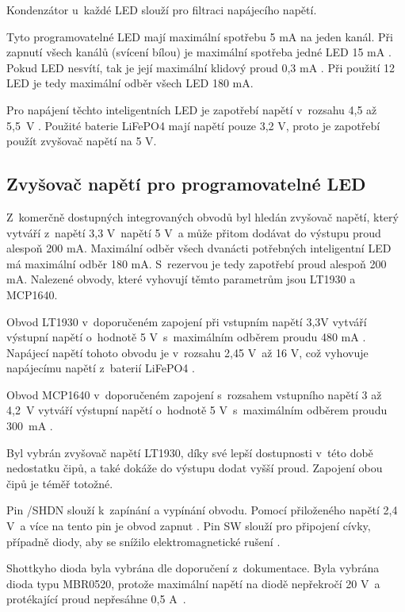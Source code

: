 Kondenzátor u~každé LED slouží pro filtraci napájecího napětí. 

Tyto programovatelné LED mají maximální spotřebu 5 mA na jeden kanál. Při zapnutí všech kanálů (svícení bílou) je maximální
spotřeba jedné LED 15 mA \cite{WS2812C_dtsh}. Pokud LED nesvítí, tak je její maximální klidový proud 0,3 mA \cite{WS2812C_dtsh}.
Při použití 12 LED je tedy maximální odběr všech LED 180 mA.

Pro napájení těchto inteligentních LED je zapotřebí napětí v~rozsahu 4,5 až 5,5~V \cite{WS2812C_dtsh}. 
Použité baterie LiFePO4 mají napětí pouze 3,2 V, proto je zapotřebí použít zvyšovač napětí na 5 V. 

\subsection{Zvyšovač napětí pro programovatelné LED}
Z~komerčně dostupných integrovaných obvodů byl hledán zvyšovač napětí, který vytváří z~napětí 3,3 V~napětí 5 V~a může přitom dodávat do výstupu proud alespoň 200 mA. 
Maximální odběr všech dvanácti potřebných inteligentní LED má maximální odběr 180 mA. S~rezervou je tedy zapotřebí proud alespoň 200 mA. Nalezené obvody, které vyhovují 
těmto parametrům jsou LT1930 a MCP1640. 

Obvod LT1930 v~doporučeném zapojení při vstupním napětí 3,3V vytváří výstupní napětí o~hodnotě 5 V~s~maximálním odběrem proudu 480 mA \cite{LT1930_dtsh}. Napájecí napětí 
tohoto obvodu je v~rozsahu 2,45 V~až 16 V, což vyhovuje napájecímu napětí z~baterií LiFePO4 \cite{LT1930_dtsh}.

Obvod MCP1640 v~doporučeném zapojení s~rozsahem vstupního napětí 3 až 4,2~V vytváří výstupní napětí o~hodnotě 5 V~s~maximálním odběrem proudu 300~mA \cite{MCP1640_dtsh}.

Byl vybrán zvyšovač napětí LT1930, díky své lepší dostupnosti v~této době nedostatku čipů, a také dokáže do výstupu dodat vyšší proud. Zapojení obou čipů je téměř totožné. 

Pin /SHDN slouží k~zapínání a vypínání obvodu. Pomocí přiloženého napětí 2,4 V~a více na tento pin je obvod zapnut \cite{LT1930_dtsh}. Pin SW slouží pro  připojení cívky, 
případně diody, aby se snížilo elektromagnetické rušení \cite{LT1930_dtsh}. 

Shottkyho dioda byla vybrána dle doporučení z~dokumentace. Byla vybrána dioda typu MBR0520, protože maximální napětí na diodě nepřekročí 20 V~a protékající proud nepřesáhne 
0,5 A~\cite{LT1930_dtsh}.

